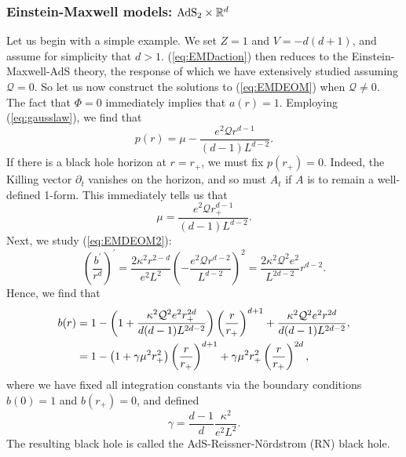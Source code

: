 \documentclass[10pt, oneside]{book}
\def\R{{{\Bbb R}}}
\begin{document}
\begin{doublespace}
\subsubsection{Einstein-Maxwell models: $\mathrm{AdS}_2 \times \R^{d}$}
Let us begin with a simple example.   We set $Z=1$ and $V=-d(d+1)$, and assume for simplicity that $d>1$.   (\ref{eq:EMDaction}) then reduces to the Einstein-Maxwell-AdS theory, the response of which we have extensively studied assuming $\mathcal{Q}=0$.    So let us now construct the solutions to (\ref{eq:EMDEOM}) when $\mathcal{Q}\ne 0$.    The fact that $\Phi=0$ immediately implies that $a(r)=1$.   Employing (\ref{eq:gausslaw}), we find that \begin{equation}
p(r) = \mu - \frac{e^2\mathcal{Q}r^{d-1}}{(d-1)L^{d-2}}.
\end{equation}
If there is a black hole horizon at $r=r_+$, we must fix $p(r_+)=0$.   Indeed, the Killing vector $\partial_t$ vanishes on the horizon, and so must $A_t$ if $A$ is to remain a well-defined 1-form.   This immediately tells us that \begin{equation}
\mu = \frac{e^2\mathcal{Q}r_+^{d-1}}{(d-1)L^{d-2}}.
\end{equation}
Next, we study (\ref{eq:EMDEOM2}): \begin{equation}
\left(\frac{b^\prime}{r^d}\right)^\prime = \frac{2\kappa^2r^{2-d}}{e^2L^2} \left(-\frac{e^2\mathcal{Q}r^{d-2}}{L^{d-2}}\right)^2 = \frac{2\kappa^2 \mathcal{Q}^2e^2}{L^{2d-2}}r^{d-2}.
\end{equation}
Hence, we find that \begin{align}
b(r) &= 1 - \left(1+\frac{\kappa^2 \mathcal{Q}^2e^2 r_+^{2d}}{d(d-1)L^{2d-2}}\right)\left(\frac{r}{r_+}\right)^{d+1}  + \frac{\kappa^2 \mathcal{Q}^2e^2 r^{2d}}{d(d-1) L^{2d-2}}, \notag \\
&= 1-\left(1+ \gamma \mu^2 r_+^2\right)\left(\frac{r}{r_+}\right)^{d+1} + \gamma \mu^2 r_+^2 \left(\frac{r}{r_+}\right)^{2d},  \label{eq:bRN}
\end{align}
where we have fixed all integration constants via the boundary conditions $b(0)=1$ and $b(r_+)=0$, and defined \begin{equation}
\gamma = \frac{d-1}{d} \frac{\kappa^2}{e^2L^2}.
\end{equation}
The resulting black hole is called the AdS-Reissner-N\"ordstrom (RN) black hole.


\end{doublespace}
\end{document}
